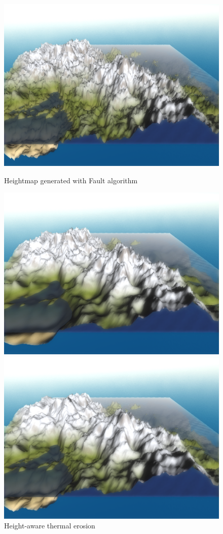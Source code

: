 \documentclass[11pt,a4paper,twoside,openright]{report}
\begin{document}
\begin{figure}[!htb]
  \includegraphics[width=\linewidth]{thermal-50-iterations-before.png}
  \caption{Heightmap generated with Fault algorithm}\label{fig:thermalbefore}
\endminipage\hfill
{}
  \includegraphics[width=\linewidth]{thermal-50-iterations-after1.png}
  \caption{Height-aware thermal erosion}\label{fig:thermalafter1}
\endminipage\hfill
{}%
  \includegraphics[width=\linewidth]{thermal-50-iterations-after2.png}

\end{figure}
\end{document}
